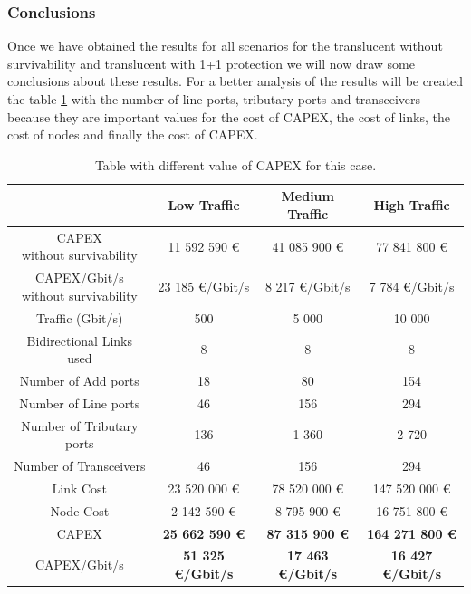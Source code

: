 \vspace{13pt}
\subsubsection{Conclusions}

Once we have obtained the results for all scenarios for the translucent without survivability and translucent with 1+1 protection we will now draw some conclusions about these results. For a better analysis of the results will be created the table \ref{table_comparative_transl_protec_heuristic} with the number of line ports, tributary ports and transceivers because they are important values for the cost of CAPEX, the cost of links, the cost of nodes and finally the cost of CAPEX.\\

\begin{table}[H]
\centering
\begin{tabular}{| c | c | c | c |}
 \hline
 & Low Traffic & Medium Traffic & High Traffic \\
 \hline\hline
 \makecell{CAPEX \\ without survivability} & 11 592 590 \euro & 41 085 900 \euro & 77 841 800 \euro \\ \hline
 \makecell{CAPEX/Gbit/s \\ without survivability} & 23 185 \euro/Gbit/s & 8 217 \euro/Gbit/s & 7 784 \euro/Gbit/s \\ \hline
 Traffic (Gbit/s) & 500 & 5 000 & 10 000 \\ \hline
 Bidirectional Links used & 8 & 8 & 8 \\ \hline
 Number of Add ports & 18 & 80 & 154 \\ \hline
 Number of Line ports & 46 & 156 & 294 \\ \hline
 Number of Tributary ports & 136 & 1 360 & 2 720 \\ \hline
 Number of Transceivers & 46 & 156 & 294 \\ \hline
 Link Cost & 23 520 000 \euro & 78 520 000 \euro & 147 520 000 \euro \\ \hline
 Node Cost & 2 142 590 \euro & 8 795 900 \euro & 16 751 800 \euro \\ \hline
 CAPEX & \textbf{25 662 590 \euro} & \textbf{87 315 900 \euro} & \textbf{164 271 800 \euro} \\ \hline
 CAPEX/Gbit/s & \textbf{51 325 \euro/Gbit/s} & \textbf{17 463 \euro/Gbit/s} & \textbf{16 427 \euro/Gbit/s} \\ \hline
\end{tabular}
\caption{Table with different value of CAPEX for this case.}
\label{table_comparative_transl_protec_heuristic}
\end{table}

